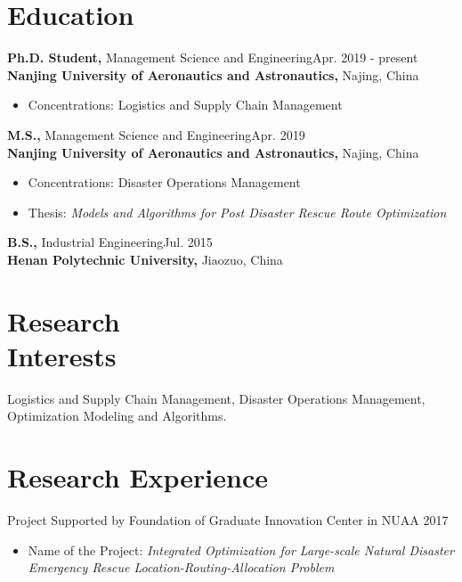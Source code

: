 \documentclass[margin]{res}
\begin{document}
 

\address{
Nanjing University of Aeronautics and Astronautics \\
29 Jiangjun Avenue, Nanjing \\
Jiangsu, China 211106}
\address{
Email: guopenghui@outlook.com \\
Homepage: https://guo.ph}

\begin{resume} 

\section{\sc Education}
{\bf Ph.D. Student,}  Management Science and Engineering\hfill Apr. 2019 - present \\
{\bf Nanjing University of Aeronautics and Astronautics,} Najing, China
\begin{itemize}  \itemsep -2pt  %
\item Concentrations: Logistics and Supply Chain Management
\end{itemize}

{\bf M.S.,}  Management Science and Engineering\hfill Apr. 2019 \\
{\bf Nanjing University of Aeronautics and Astronautics,} Najing, China
\begin{itemize}  \itemsep -2pt  %
\item Concentrations: Disaster Operations Management
\item Thesis: {\it Models and Algorithms for Post Disaster Rescue Route Optimization}
\end{itemize}

{\bf B.S.,}  Industrial Engineering\hfill Jul. 2015 \\
{\bf Henan Polytechnic University,} Jiaozuo, China


\section{\sc Research \\Interests}
Logistics and Supply Chain Management, Disaster Operations Management, Optimization Modeling and Algorithms.


\section{\sc Research Experience}
Project Supported by Foundation of Graduate Innovation Center in NUAA \hfill 2017
\begin{itemize} \itemsep -2pt  %
\item Name of the Project: {\it Integrated Optimization for Large-scale Natural Disaster Emergency Rescue Location-Routing-Allocation Problem}
\end{itemize}



\end{resume}
\end{document}
